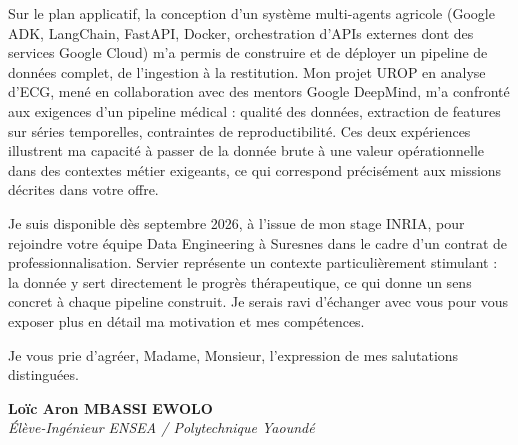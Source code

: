 \documentclass[a4paper,11pt]{article}
\begin{document}
Sur le plan applicatif, la conception d'un système multi-agents agricole (Google ADK, LangChain, FastAPI, Docker, orchestration d'APIs externes dont des services Google Cloud) m'a permis de construire et de déployer un pipeline de données complet, de l'ingestion à la restitution. Mon projet UROP en analyse d'ECG, mené en collaboration avec des mentors Google DeepMind, m'a confronté aux exigences d'un pipeline médical : qualité des données, extraction de features sur séries temporelles, contraintes de reproductibilité. Ces deux expériences illustrent ma capacité à passer de la donnée brute à une valeur opérationnelle dans des contextes métier exigeants, ce qui correspond précisément aux missions décrites dans votre offre.

Je suis disponible dès septembre 2026, à l'issue de mon stage INRIA, pour rejoindre votre équipe Data Engineering à Suresnes dans le cadre d'un contrat de professionnalisation. Servier représente un contexte particulièrement stimulant : la donnée y sert directement le progrès thérapeutique, ce qui donne un sens concret à chaque pipeline construit. Je serais ravi d'échanger avec vous pour vous exposer plus en détail ma motivation et mes compétences.

Je vous prie d'agréer, Madame, Monsieur, l'expression de mes salutations distinguées.

\vspace{0.8cm}

\textbf{Loïc Aron MBASSI EWOLO}\\
\textit{Élève-Ingénieur ENSEA / Polytechnique Yaoundé}
\end{document}
